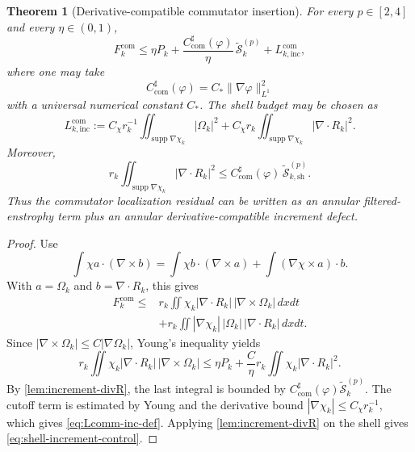 \documentclass[11pt]{article}
\numberwithin{equation}{section}
\theoremstyle{plain}
\newtheorem{theorem}{Theorem}[section]
\theoremstyle{definition}
\theoremstyle{remark}
\DeclareMathOperator{\supp}{supp}
\begin{document}
\begin{theorem}[Derivative-compatible commutator insertion]\label{thm:increment-comm}
For every $p\in[2,4]$ and every $\eta\in(0,1)$,
\begin{equation}\label{eq:increment-comm}
F_k^{\mathrm{com}}
\le
\eta P_k
+
\frac{C_{\mathrm{com}}^{\sharp}(\varphi)}{\eta}\,\widetilde{\mathcal S}_k^{(p)}
+
L_{k,\mathrm{inc}}^{\mathrm{com}},
\end{equation}
where one may take
\begin{equation}\label{eq:Ccomm-def}
C_{\mathrm{com}}^{\sharp}(\varphi)
=C_*\|\nabla\varphi\|_{L^1}^2
\end{equation}
with a universal numerical constant $C_*$.  The shell budget may be chosen as
\begin{equation}\label{eq:Lcomm-inc-def}
L_{k,\mathrm{inc}}^{\mathrm{com}}
:=
C_\chi r_k^{-1}\iint_{\supp\nabla\chi_k}|\Omega_k|^2
+
C_\chi r_k\iint_{\supp\nabla\chi_k}|\nabla\!\cdot R_k|^2.
\end{equation}
Moreover,
\begin{equation}\label{eq:shell-increment-control}
r_k\iint_{\supp\nabla\chi_k}|\nabla\!\cdot R_k|^2
\le
C_{\mathrm{com}}^{\sharp}(\varphi)\,\widetilde{\mathcal S}_{k,\mathrm{sh}}^{(p)}.
\end{equation}
Thus the commutator localization residual can be written as an annular filtered-enstrophy term plus an annular derivative-compatible increment defect.
\end{theorem}

\begin{proof}
Use
\[
\int \chi a\cdot(\nabla\times b)
=
\int \chi b\cdot(\nabla\times a)
+
\int (\nabla\chi\times a)\cdot b.
\]
With $a=\Omega_k$ and $b=\nabla\!\cdot R_k$, this gives
\begin{align*}
F_k^{\mathrm{com}}
\le{}&
r_k\iint\chi_k|\nabla\!\cdot R_k|\,|\nabla\times\Omega_k|\,dxdt\\
&+
r_k\iint|\nabla\chi_k|\,|\Omega_k|\,|\nabla\!\cdot R_k|\,dxdt .
\end{align*}
Since $|\nabla\times\Omega_k|\le C|\nabla\Omega_k|$, Young's inequality yields
\[
r_k\iint\chi_k|\nabla\!\cdot R_k|\,|\nabla\times\Omega_k|
\le
\eta P_k
+
\frac{C}{\eta}r_k\iint\chi_k|\nabla\!\cdot R_k|^2.
\]
By \cref{lem:increment-divR}, the last integral is bounded by $C_{\mathrm{com}}^{\sharp}(\varphi)\widetilde{\mathcal S}_k^{(p)}$.  The cutoff term is estimated by Young and the derivative bound $|\nabla\chi_k|\le C_\chi r_k^{-1}$, which gives \eqref{eq:Lcomm-inc-def}.  Applying \cref{lem:increment-divR} on the shell gives \eqref{eq:shell-increment-control}.
\end{proof}
\end{document}
